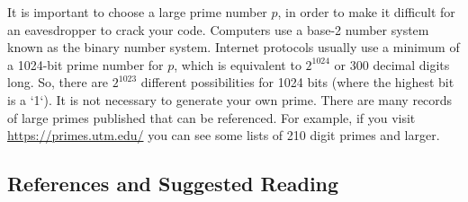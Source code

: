 It is important to choose a large prime number $p$, in order to make it difficult for an eavesdropper to crack your code.  Computers use a base-2 number system known as the binary number system.  Internet protocols usually use a minimum of a 1024-bit prime number for $p$, which is equivalent to $2^{1024}$ or 300 decimal digits long.  So, there are $2^{1023}$ different possibilities for 1024 bits (where the highest bit is a `1`). It is not necessary to generate your own prime.  There are many records of large primes published that can be referenced. For example, if you visit \url{https://primes.utm.edu/} you can see some lists of 210 digit primes and larger.

\newpage  

\subsection{References and Suggested Reading} 
